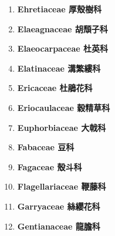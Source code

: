 \begin{enumerate}
        
      \item[] \begin{small}\textbf{Ehretiaceae 厚殼樹科} \end{small}
        
      \item[] \begin{small}\textbf{Elaeagnaceae 胡頹子科} \end{small}
        
      \item[] \begin{small}\textbf{Elaeocarpaceae 杜英科} \end{small}
        
      \item[] \begin{small}\textbf{Elatinaceae 溝繁縷科} \end{small}
        
      \item[] \begin{small}\textbf{Ericaceae 杜鵑花科} \end{small}
        
      \item[] \begin{small}\textbf{Eriocaulaceae 穀精草科} \end{small}
        
      \item[] \begin{small}\textbf{Euphorbiaceae 大戟科} \end{small}
        
      \item[] \begin{small}\textbf{Fabaceae 豆科} \end{small}
        
      \item[] \begin{small}\textbf{Fagaceae 殼斗科} \end{small}
        
      \item[] \begin{small}\textbf{Flagellariaceae 鞭藤科} \end{small}
        
      \item[] \begin{small}\textbf{Garryaceae 絲纓花科} \end{small}
        
      \item[] \begin{small}\textbf{Gentianaceae 龍膽科} \end{small}

\end{enumerate}
